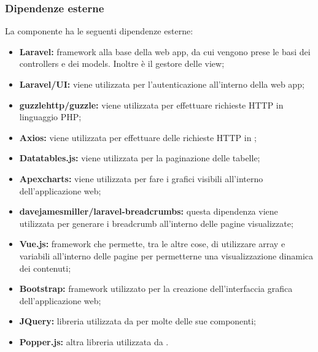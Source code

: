 	\subsubsection{Dipendenze esterne}
		La componente ha le seguenti dipendenze esterne:
		\begin{itemize}
			\item \textbf{Laravel:} framework alla base della web app, da cui vengono prese le basi dei controllers e dei models. Inoltre è il gestore delle view;
			\item \textbf{Laravel/UI:} viene utilizzata per l'autenticazione all'interno della web app;
			\item \textbf{guzzlehttp/guzzle:} viene utilizzata per effettuare richieste HTTP in linguaggio PHP;
			\item \textbf{Axios:} viene utilizzata per effettuare delle richieste HTTP in ;
			\item \textbf{Datatables.js:} viene utilizzata per la paginazione delle tabelle;
			\item \textbf{Apexcharts:} viene utilizzata per fare i grafici visibili all'interno dell'applicazione web;
			\item \textbf{davejamesmiller/laravel-breadcrumbs:} questa dipendenza viene utilizzata per generare i breadcrumb all'interno delle pagine visualizzate;
			\item \textbf{Vue.js:} framework che permette, tra le altre cose, di utilizzare array e variabili all'interno delle pagine per permetterne una visualizzazione dinamica dei contenuti;
			\item \textbf{Bootstrap:} framework utilizzato per la creazione dell'interfaccia grafica dell'applicazione web;
			\item \textbf{JQuery:} libreria utilizzata da  per molte delle sue componenti;
			\item \textbf{Popper.js:} altra libreria utilizzata da .
		\end{itemize}



